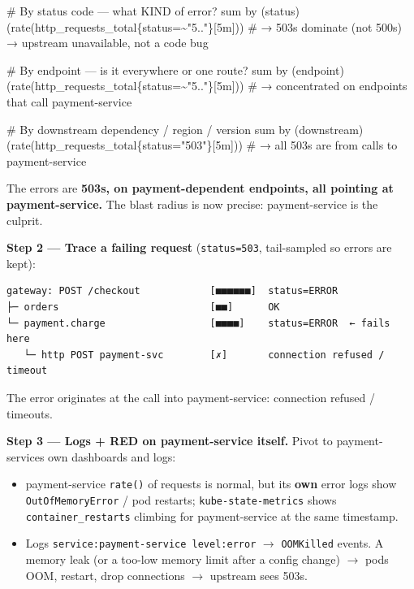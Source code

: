 \documentclass[11pt]{article}
\providecommand{\tightlist}{\setlength{\itemsep}{1pt}\setlength{\parskip}{0pt}}
\newenvironment{Shaded}{\begin{snugshade}}{\end{snugshade}}
\newcommand{\NormalTok}[1]{\textcolor[rgb]{0.81,0.81,0.76}{#1}}
\begin{document}

\begin{Shaded}
\begin{Highlighting}[]
\NormalTok{\# By status code — what KIND of error?}
\NormalTok{sum by (status) (rate(http\_requests\_total\{status=\textasciitilde{}"5.."\}[5m]))}
\NormalTok{\#   → 503s dominate (not 500s) → upstream unavailable, not a code bug}

\NormalTok{\# By endpoint — is it everywhere or one route?}
\NormalTok{sum by (endpoint) (rate(http\_requests\_total\{status=\textasciitilde{}"5.."\}[5m]))}
\NormalTok{\#   → concentrated on endpoints that call payment{-}service}

\NormalTok{\# By downstream dependency / region / version}
\NormalTok{sum by (downstream) (rate(http\_requests\_total\{status="503"\}[5m]))}
\NormalTok{\#   → all 503s are from calls to payment{-}service}
\end{Highlighting}
\end{Shaded}

The errors are \textbf{503s, on payment-dependent endpoints, all pointing at payment-service.} The blast radius is now precise: payment-service is the culprit.

\textbf{Step 2 --- Trace a failing request} (\texttt{status=503}, tail-sampled so errors are kept):

\setcodelang{}

\begin{verbatim}
gateway: POST /checkout            [■■■■■■]  status=ERROR
├─ orders                          [■■]      OK
└─ payment.charge                  [■■■■]    status=ERROR  ← fails here
   └─ http POST payment-svc        [✗]       connection refused / timeout
\end{verbatim}

The error originates at the call into payment-service: connection refused / timeouts.

\textbf{Step 3 --- Logs + RED on payment-service itself.} Pivot to payment-service\textquotesingle s own dashboards and logs:

\begin{itemize}
\tightlist
\item
  payment-service \texttt{rate()} of requests is normal, but its \textbf{own} error logs show \texttt{OutOfMemoryError} / pod restarts; \texttt{kube-state-metrics} shows \texttt{container\_restarts} climbing for payment-service at the same timestamp.
\item
  Logs \texttt{service:payment-service\ level:error} \(\rightarrow\) \texttt{OOMKilled} events. A memory leak (or a too-low memory limit after a config change) \(\rightarrow\) pods OOM, restart, drop connections \(\rightarrow\) upstream sees 503s.
\end{itemize}
\end{document}
